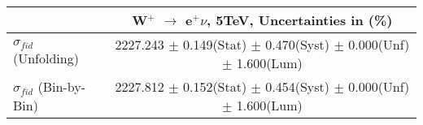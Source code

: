 \documentclass[12pt]{article}
\begin{document}
\begin{table}[ht]
\begin{tabular}{c|c|}
\cline{2-2}
                                                           &    W$^{+}$ $\rightarrow$ e$^{+} \nu $, 5TeV, Uncertainties in (\%)  \\ \hline 
\multicolumn{1}{|l|}{$\sigma_{fid}$ (Unfolding)}         &    2227.243   $\pm$ 0.149(Stat) $\pm$ 0.470(Syst) $\pm$ 0.000(Unf) $\pm$ 1.600(Lum)     \\ \hline 
\multicolumn{1}{|l|}{$\sigma_{fid}$ (Bin-by-Bin)}        &    2227.812   $\pm$ 0.152(Stat) $\pm$ 0.454(Syst) $\pm$ 0.000(Unf) $\pm$ 1.600(Lum)     \\ \hline 
\end{tabular}
\end{table}
\end{document}
